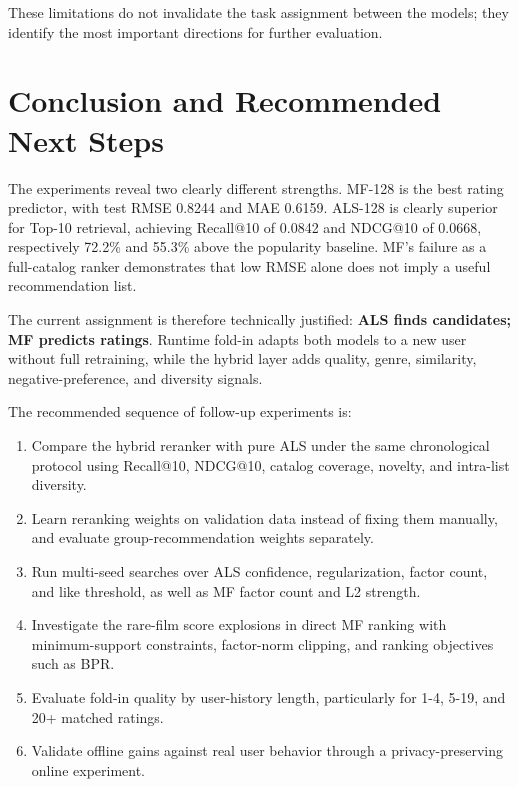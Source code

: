 \documentclass[11pt,a4paper]{article}
\begin{document}
These limitations do not invalidate the task assignment between the models; they identify the most important directions for further evaluation.

\section{Conclusion and Recommended Next Steps}

The experiments reveal two clearly different strengths. MF-128 is the best rating predictor, with test RMSE 0.8244 and MAE 0.6159. ALS-128 is clearly superior for Top-10 retrieval, achieving Recall@10 of 0.0842 and NDCG@10 of 0.0668, respectively 72.2\% and 55.3\% above the popularity baseline. MF's failure as a full-catalog ranker demonstrates that low RMSE alone does not imply a useful recommendation list.

The current assignment is therefore technically justified: \textbf{ALS finds candidates; MF predicts ratings}. Runtime fold-in adapts both models to a new user without full retraining, while the hybrid layer adds quality, genre, similarity, negative-preference, and diversity signals.

The recommended sequence of follow-up experiments is:

\begin{enumerate}
  \item Compare the hybrid reranker with pure ALS under the same chronological protocol using Recall@10, NDCG@10, catalog coverage, novelty, and intra-list diversity.
  \item Learn reranking weights on validation data instead of fixing them manually, and evaluate group-recommendation weights separately.
  \item Run multi-seed searches over ALS confidence, regularization, factor count, and like threshold, as well as MF factor count and L2 strength.
  \item Investigate the rare-film score explosions in direct MF ranking with minimum-support constraints, factor-norm clipping, and ranking objectives such as BPR.
  \item Evaluate fold-in quality by user-history length, particularly for 1-4, 5-19, and 20+ matched ratings.
  \item Validate offline gains against real user behavior through a privacy-preserving online experiment.
\end{enumerate}
\end{document}

